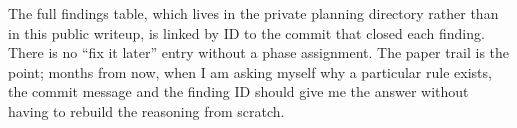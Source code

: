 \documentclass[12pt]{article}
\begin{document}
The full findings table, which lives in the private planning directory rather than in this public writeup, is linked by ID to the commit that closed each finding. There is no ``fix it later'' entry without a phase assignment. The paper trail is the point; months from now, when I am asking myself why a particular rule exists, the commit message and the finding ID should give me the answer without having to rebuild the reasoning from scratch.
\end{document}
